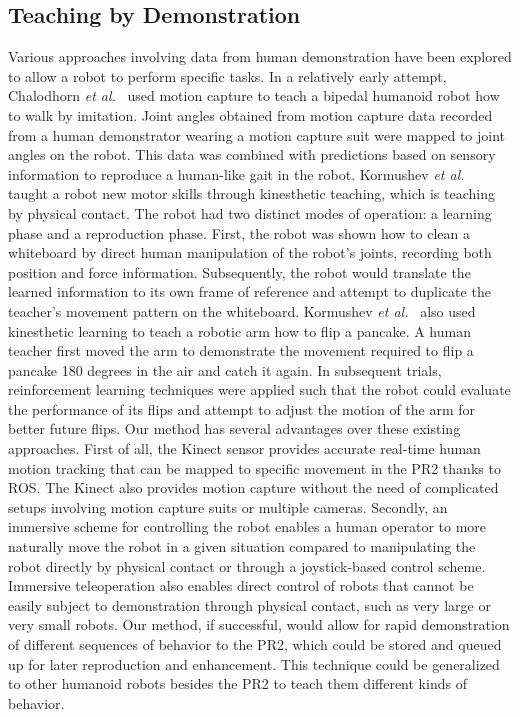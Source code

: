 \documentclass{sig-alternate}
\begin{document}
\subsection{Teaching by Demonstration}
\label{sec:demo_teach}
\indent Various approaches involving data from human demonstration have been explored to allow a robot to perform specific tasks. In a relatively early attempt, Chalodhorn \textit{et al.}~\cite{walk_imitation} used motion capture to teach a bipedal humanoid robot how to walk by imitation. Joint angles obtained from motion capture data recorded from a human demonstrator wearing a motion capture suit were mapped to joint angles on the robot. This data was combined with predictions based on sensory information to reproduce a human-like gait in the robot. Kormushev \textit{et al.}~\cite{whiteboard} taught a robot new motor skills through kinesthetic teaching, which is teaching by physical contact. The robot had two distinct modes of operation: a learning phase and a reproduction phase. First, the robot was shown how to clean a whiteboard by direct human manipulation of the robot's joints, recording both position and force information. Subsequently, the robot would translate the learned information to its own frame of reference and attempt to duplicate the teacher's movement pattern on the whiteboard.  Kormushev \textit{et al.}~\cite{pancakes} also used kinesthetic learning to teach a robotic arm how to flip a pancake. A human teacher first moved the arm to demonstrate the movement required to flip a pancake 180 degrees in the air and catch it again. In subsequent trials, reinforcement learning techniques were applied such that the robot could evaluate the performance of its flips and attempt to adjust the motion of the arm for better future flips.
\indent Our method has several advantages over these existing approaches. First of all, the Kinect sensor provides accurate real-time human
motion tracking that can be mapped to specific movement in the PR2 thanks to ROS. The Kinect also provides motion capture without the need
of complicated setups involving motion capture suits or multiple cameras. Secondly, an immersive scheme for controlling the robot
enables a human operator to more naturally move the robot in a given situation compared to manipulating the robot directly by physical
contact or through a joystick-based control scheme. Immersive teleoperation also enables direct control of robots that cannot be easily
subject to demonstration through physical contact, such as very large or very small robots. Our method, if successful, would allow for rapid demonstration of different sequences of behavior to the PR2, which could be stored and queued up for later reproduction and enhancement. This technique could be generalized to other humanoid robots besides the PR2 to teach them different kinds of behavior.
\end{document}
